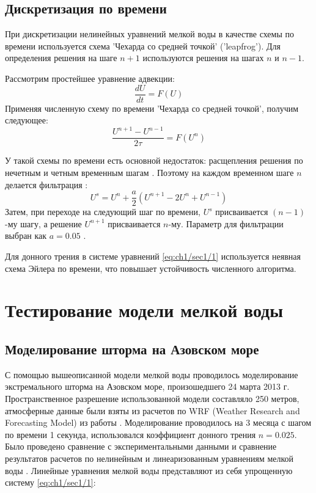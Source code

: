 \subsection{Дискретизация по времени}\label{sec:ch1/sec2-2}

При дискретизации нелинейных уравнений мелкой воды в качестве схемы по времени  используется схема 'Чехарда со средней точкой' ('leapfrog').
Для определения решения на шаге $n+1$ используются решения на шагах $n$ и $n-1$.

Рассмотрим простейшее уравнение адвекции:
\begin{equation} \label{eq:ch1/sec1/6}
    \frac{dU}{dt} = F(U)
\end{equation}
Применяя численную схему по времени 'Чехарда со средней точкой', получим следующее:
\begin{equation} \label{eq:ch1/sec1/7}
    \frac{U^{n+1} -U^{n-1} }{2\tau } = F(U^{n})
\end{equation}

У такой схемы по времени есть основной недостаток: расщепления решения по нечетным и четным временным шагам \cite{ROUCH}.
Поэтому на каждом временном шаге $n$ делается фильтрация \cite{POM}:
\begin{equation} \label{eq:ch1/sec1/8}
    U^{s} = U^{n} + \frac{a}{2}(U^{n+1} - 2U^n + U^{n-1})
\end{equation}
Затем, при переходе на следующий шаг по времени, $U^{s}$ присваивается $(n-1)$-му шагу, а решение $U^{n+1}$ присваивается $n$-му.
Параметр для фильтрации выбран как $a = 0.05$ \cite{POM}.

Для донного трения в системе уравнений \cref{eq:ch1/sec1/1} используется неявная схема Эйлера по времени,
что повышает устойчивость численного алгоритма.

\section{Тестирование модели мелкой воды}


\subsection{Моделирование шторма на Азовском море}

С помощью вышеописанной модели мелкой воды проводилось моделирование экстремального шторма на Азовском море, произошедшего 24 марта 2013 г.
Пространственное разрешение использованной модели составляло 250 метров,
атмосферные данные были взяты из расчетов по WRF (Weather Research and Forecasting
Model) из работы \cite{AzovStorm}. 
Моделирование проводилось на 3 месяца с шагом по времени 1 секунда, использовался коэффициент донного трения $n = 0.025$.
Было проведено сравнение с экспериментальными данными и сравнение результатов расчетов по нелинейным и линеаризованным уравнениям мелкой воды \cite{MARESEDU}.
Линейные уравнения мелкой воды представляют из себя упрощенную систему \ref{eq:ch1/sec1/1}:

